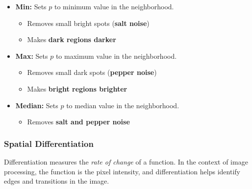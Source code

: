 \begin{itemize}
  \item \textbf{Min:} Sets $p$ to minimum value in the neighborhood.
    \begin{itemize}
        \vspace{-0.2cm}
      \item Removes small bright spots (\textbf{salt noise})
      \item Makes \textbf{dark regions darker}
    \end{itemize}
  \item \textbf{Max:} Sets $p$ to maximum value in the neighborhood.
    \begin{itemize}
        \vspace{-0.2cm}
      \item Removes small dark spots (\textbf{pepper noise})
      \item Makes \textbf{bright regions brighter}
    \end{itemize}
  \item \textbf{Median:} Sets $p$ to median value in the neighborhood.
    \begin{itemize}
        \vspace{-0.2cm}
      \item Removes \textbf{salt and pepper noise}
    \end{itemize}
\end{itemize}

\subsubsection*{Spatial Differentiation}

Differentiation measures the \textit{rate of change} of a function.
In the context of image processing, the function is the pixel
intensity, and differentiation helps identify edges and transitions
in the image.

